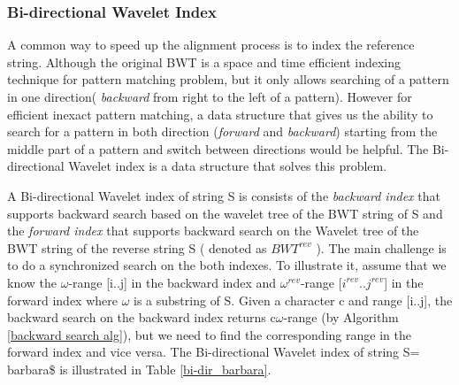 \documentclass[11pt,a4paper]{report}
\begin{document}


\subsubsection{Bi-directional Wavelet Index}

A common way to speed up the alignment process is to index the reference string. 
Although the original BWT is a space and time efficient indexing technique for 
pattern matching problem, but it only allows  searching of a pattern in one 
direction( \emph{backward} from right to the left of a pattern). 
However for efficient inexact pattern matching, a data structure that gives us 
the ability to search for a pattern in both direction (\emph{forward} and \emph{backward}) 
starting from the middle part of a pattern and switch between directions would 
be helpful. The Bi-directional Wavelet index is a data structure that solves 
this problem.

A Bi-directional Wavelet index of string S is consists of \cite{bidirectional}
the \emph{backward index} that supports backward search based on the wavelet tree of 
the BWT string of S and the \emph{forward index} that supports backward search
on the Wavelet tree of the BWT string of the reverse string S ( denoted as 
$BWT^{rev}$ ). The main challenge is to do a synchronized search on the both indexes.
To illustrate it, assume that we know the $\omega$-range [i..j] in the backward 
index and $\omega^{rev}$-range [$i^{rev}$..$j^{rev}$] in the forward index 
where $\omega$ is a substring of S.
Given a character c and range [i..j], the backward search on the backward 
index returns c$\omega$-range (by Algorithm \ref{backward search alg}), 
but we need to find the corresponding range in the forward index and vice versa.
The Bi-directional Wavelet index of string S= barbara\$ is 
illustrated in Table \ref{bi-dir_barbara}.
\end{document}
